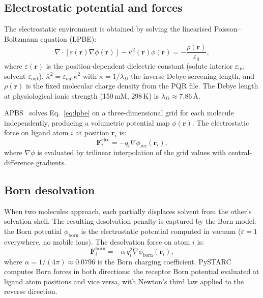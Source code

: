 \documentclass[journal=jctcce,manuscript=article,layout=twocolumn]{achemso}
\begin{document}
\subsection{Electrostatic potential and forces}

The electrostatic environment is obtained by solving the linearised
Poisson--Boltzmann equation (LPBE):~\cite{Baker2001APBS}
\begin{equation}
\nabla\cdot[\varepsilon(\mathbf{r})\nabla\phi(\mathbf{r})]
- \bar{\kappa}^2(\mathbf{r})\phi(\mathbf{r})
= -\frac{\rho(\mathbf{r})}{\varepsilon_0},
\label{eq:lpbe}
\end{equation}
where $\varepsilon(\mathbf{r})$ is the position-dependent dielectric
constant (solute interior $\varepsilon_\mathrm{in}$, solvent
$\varepsilon_\mathrm{out}$), $\bar{\kappa}^2 =
\varepsilon_\mathrm{out}\kappa^2$ with $\kappa = 1/\lambda_D$ the
inverse Debye screening length, and $\rho(\mathbf{r})$ is the
fixed molecular charge density from the PQR file.
The Debye length at physiological ionic strength (150\,mM, 298\,K)
is $\lambda_D \approx 7.86$\,\AA.

APBS~\cite{Baker2001APBS} solves Eq.~\ref{eq:lpbe} on a
three-dimensional grid for each molecule independently,
producing a volumetric potential map $\phi(\mathbf{r})$.
The electrostatic force on ligand atom $i$ at position
$\mathbf{r}_i$ is:
\begin{equation}
\mathbf{F}_i^\mathrm{elec} = -q_i \nabla\phi_\mathrm{rec}(\mathbf{r}_i),
\label{eq:f_elec}
\end{equation}
where $\nabla\phi$ is evaluated by trilinear interpolation of
the grid values with central-difference gradients.

\subsection{Born desolvation}

When two molecules approach, each partially displaces solvent from
the other's solvation shell.
The resulting desolvation penalty is captured by the Born model:
the Born potential $\phi_\mathrm{born}$ is the electrostatic
potential computed in vacuum ($\varepsilon = 1$ everywhere, no
mobile ions).
The desolvation force on atom $i$ is:~\cite{GabdoullineWade2002}
\begin{equation}
\mathbf{F}_i^\mathrm{born} = -\alpha\, q_i^2
\nabla\phi_\mathrm{born}(\mathbf{r}_i),
\label{eq:f_born}
\end{equation}
where $\alpha = 1/(4\pi) \approx 0.0796$ is the Born charging
coefficient.
PySTARC computes Born forces in both directions: the receptor Born
potential evaluated at ligand atom positions and vice versa, with
Newton's third law applied to the reverse direction.
\end{document}
